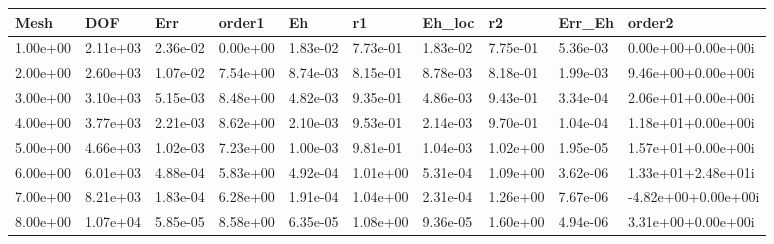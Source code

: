 \begin{tabular}{llllllllll}
Mesh & DOF & Err & order1 & Eh & r1 & Eh_loc & r2 & Err_Eh & order2 \\ 
\hline 
1.00e+00 & 2.11e+03 & 2.36e-02 & 0.00e+00 & 1.83e-02 & 7.73e-01 & 1.83e-02 & 7.75e-01 & 5.36e-03 &  0.00e+00+0.00e+00i \\ 
2.00e+00 & 2.60e+03 & 1.07e-02 & 7.54e+00 & 8.74e-03 & 8.15e-01 & 8.78e-03 & 8.18e-01 & 1.99e-03 &  9.46e+00+0.00e+00i \\ 
3.00e+00 & 3.10e+03 & 5.15e-03 & 8.48e+00 & 4.82e-03 & 9.35e-01 & 4.86e-03 & 9.43e-01 & 3.34e-04 &  2.06e+01+0.00e+00i \\ 
4.00e+00 & 3.77e+03 & 2.21e-03 & 8.62e+00 & 2.10e-03 & 9.53e-01 & 2.14e-03 & 9.70e-01 & 1.04e-04 &  1.18e+01+0.00e+00i \\ 
5.00e+00 & 4.66e+03 & 1.02e-03 & 7.23e+00 & 1.00e-03 & 9.81e-01 & 1.04e-03 & 1.02e+00 & 1.95e-05 &  1.57e+01+0.00e+00i \\ 
6.00e+00 & 6.01e+03 & 4.88e-04 & 5.83e+00 & 4.92e-04 & 1.01e+00 & 5.31e-04 & 1.09e+00 & 3.62e-06 &  1.33e+01+2.48e+01i \\ 
7.00e+00 & 8.21e+03 & 1.83e-04 & 6.28e+00 & 1.91e-04 & 1.04e+00 & 2.31e-04 & 1.26e+00 & 7.67e-06 & -4.82e+00+0.00e+00i \\ 
8.00e+00 & 1.07e+04 & 5.85e-05 & 8.58e+00 & 6.35e-05 & 1.08e+00 & 9.36e-05 & 1.60e+00 & 4.94e-06 &  3.31e+00+0.00e+00i \\ 
\hline 
\end{tabular}